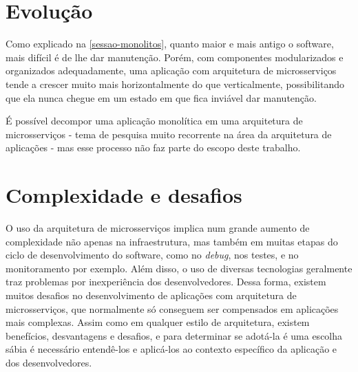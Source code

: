 \section{Evolução}

Como explicado na \autoref{sessao-monolitos}, quanto maior e mais antigo o software, mais difícil é de lhe dar manutenção. Porém, com componentes modularizados e organizados adequadamente, uma aplicação com arquitetura de microsserviços tende a crescer muito mais horizontalmente do que verticalmente, possibilitando que ela nunca chegue em um estado em que fica inviável dar manutenção. 

É possível decompor uma aplicação monolítica em uma arquitetura de microsserviços - tema de pesquisa muito recorrente na área da arquitetura de aplicações - mas esse processo não faz parte do escopo deste trabalho.


\section{Complexidade e desafios}

O uso da arquitetura de microsserviços implica num grande aumento de complexidade não apenas na infraestrutura, mas também em muitas etapas do ciclo de desenvolvimento do software, como no \emph{debug}, nos testes, e no monitoramento por exemplo. Além disso, o uso de diversas tecnologias geralmente traz problemas por inexperiência dos desenvolvedores. Dessa forma, existem muitos desafios no desenvolvimento de aplicações com arquitetura de microsserviços, que normalmente só conseguem ser compensados em aplicações mais complexas. Assim como em qualquer estilo de arquitetura, existem benefícios, desvantagens e desafios, e para determinar se adotá-la é uma escolha sábia é necessário entendê-los e aplicá-los ao contexto específico da aplicação e dos desenvolvedores. \cite{top10-microservices-challenges,martin-fowler-microservice-tradeoffs}

